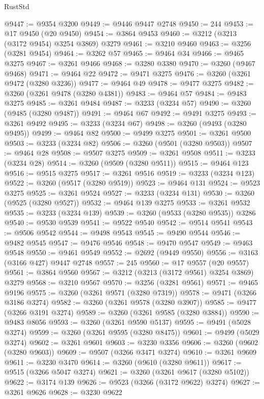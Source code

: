 \begin{lexlean}{RustStd}
\begin{coremodule}
{\begin{coremodule}
{{{{{{{{{{{{{{{{{{{{{{{{{{@9447 := @9354 @3200
@9449 := @9446 @9447 @2748
@9450 := 244
@9453 := @17 @9450 (@20 @9450)
@9454 := @3864 @9453
@9460 := @3212 (@3213 (@3172 @9454) @3254 @3869) @3279
@9461 := @3210 @9460
@9463 := @3256 (@3281 @9454)
@9464 := @3262 @57
@9465 := @9464 @34
@9466 := @9465 @3275
@9467 := @3261 @9466
@9468 := @3280 @3380
@9470 := @3260 (@9467 @9468)
@9471 := @9464 @22
@9472 := @9471 @3275
@9476 := @3260 (@3261 @9472 (@3280 @3236))
@9477 := @9464 @49
@9478 := @9477 @3275
@9482 := @3260 (@3261 @9478 (@3280 @4381))
@9483 := @9464 @57
@9484 := @9483 @3275
@9485 := @3261 @9484
@9487 := @3233 (@3234 @57)
@9490 := @3260 (@9485 (@3280 @9487))
@9491 := @9464 @67
@9492 := @9491 @3275
@9493 := @3261 @9492
@9495 := @3233 (@3234 @67)
@9498 := @3260 (@9493 (@3280 @9495))
@9499 := @9464 @82
@9500 := @9499 @3275
@9501 := @3261 @9500
@9503 := @3233 (@3234 @82)
@9506 := @3260 (@9501 (@3280 @9503))
@9507 := @9464 @28
@9508 := @9507 @3275
@9509 := @3261 @9508
@9511 := @3233 (@3234 @28)
@9514 := @3260 (@9509 (@3280 @9511))
@9515 := @9464 @123
@9516 := @9515 @3275
@9517 := @3261 @9516
@9519 := @3233 (@3234 @123)
@9522 := @3260 (@9517 (@3280 @9519))
@9523 := @9464 @131
@9524 := @9523 @3275
@9525 := @3261 @9524
@9527 := @3233 (@3234 @131)
@9530 := @3260 (@9525 (@3280 @9527))
@9532 := @9464 @139 @3275
@9533 := @3261 @9532
@9535 := @3233 (@3234 @139)
@9539 := @3260 (@9533 (@3280 @9535)) @3286
@9540 := @9530 @9539
@9541 := @9522 @9540
@9542 := @9514 @9541
@9543 := @9506 @9542
@9544 := @9498 @9543
@9545 := @9490 @9544
@9546 := @9482 @9545
@9547 := @9476 @9546
@9548 := @9470 @9547
@9549 := @9463 @9548
@9550 := @9461 @9549
@9552 := @2692 (@9449 @9550)
@9556 := @3163 (@3166 @427) @9447 @2748
@9557 := 245
@9560 := @17 @9557 (@20 @9557)
@9561 := @3864 @9560
@9567 := @3212 (@3213 (@3172 @9561) @3254 @3869) @3279
@9568 := @3210 @9567
@9570 := @3256 (@3281 @9561)
@9571 := @9465 @9196
@9575 := @3260 (@3261 @9571 (@3280 @7319))
@9578 := @9471 (@3266 @3186 @3274)
@9582 := @3260 (@3261 @9578 (@3280 @3907))
@9585 := @9477 (@3266 @3191 @3274)
@9589 := @3260 (@3261 @9585 (@3280 @3884))
@9590 := @9483 @8056
@9593 := @3260 (@3261 @9590 @5137)
@9595 := @9491 (@5028 @3274)
@9599 := @3260 (@3261 @9595 (@3280 @8475))
@9601 := @9499 (@5029 @3274)
@9602 := @3261 @9601
@9603 := @3230 @3356
@9606 := @3260 (@9602 (@3280 @9603))
@9609 := @9507 (@3266 @3471 @3274)
@9610 := @3261 @9609
@9611 := @3230 @3470
@9614 := @3260 (@9610 (@3280 @9611))
@9617 := @9515 (@3266 @5047 @3274)
@9621 := @3260 (@3261 @9617 (@3280 @5102))
@9622 := @3174 @139
@9626 := @9523 (@3266 (@3172 @9622) @3274)
@9627 := @3261 @9626
@9628 := @3230 @9622
}}}}}}}}}}}}}}}}}}}}}}}}}}
\end{coremodule}}
\end{coremodule}
\end{lexlean}
